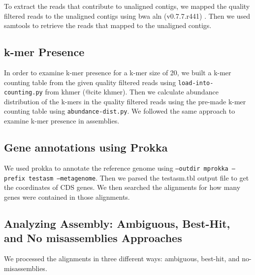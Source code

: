 \documentclass[10pt,a4paper,twocolumn]{article}
\begin{document}
To extract the reads that contribute to unaligned contigs, we mapped
the quality filtered reads to the unaligned contigs using bwa aln
(v0.7.7.r441) \cite{bwa}.  Then we used samtools to retrieve the reads
that mapped to the unaligned contigs.





\subsection*{k-mer Presence}
In order to examine k-mer presence for a k-mer size of 20, we built a
k-mer counting table from the given quality filtered reads using
{\tt{load-into-counting.py}} from khmer (@cite khmer). Then we
calculate abundance distribution of the k-mers in the quality filtered
reads using the pre-made k-mer counting table using
{\tt{abundance-dist.py}}. We followed the same approach to examine
k-mer presence in assemblies.

\subsection*{Gene annotations using Prokka}
We used prokka \cite{prokka} to annotate the reference genome using
{\tt{--outdir mprokka --prefix testasm --metagenome}}. Then we parsed
the testasm.tbl output file to get the coordinates of CDS genes. We then
searched the alignments for how many genes were contained in those
alignments.

\subsection*{Analyzing Assembly: Ambiguous, Best-Hit, and No misassemblies Approaches}
We processed the alignments in three different ways: ambiguous,
best-hit, and no-misassemblies.

\end{document}
